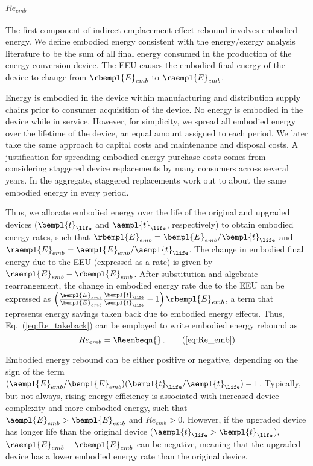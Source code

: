\paragraph{$Re_{emb}$}
\label{sec:Re_emb}

The first component of indirect emplacement effect rebound
involves embodied energy.
We define embodied energy consistent with the energy/exergy analysis literature
to be the sum of all final energy consumed
in the production of the energy conversion device.
The EEU
causes the embodied final energy of the device to change
from $\rbempl{E}_{emb}$ to $\raempl{E}_{emb}$.

Energy is embodied in the device within manufacturing and distribution supply chains
prior to consumer acquisition of the device.
No energy is embodied in the device while in service.
However, for simplicity, we spread all embodied energy
over the lifetime of the device,
an equal amount assigned to each period.
We later take the same approach to capital costs and
maintenance and disposal costs.
A justification for spreading embodied energy purchase costs comes from considering
staggered device replacements by many consumers across several years.
In the aggregate, staggered replacements
work out to about the same embodied energy in every period.

Thus, we allocate embodied energy over the life of the original and upgraded devices
($\bempl{t}_{\life}$ and $\aempl{t}_{\life}$, respectively)
to obtain embodied energy rates, such that
$\rbempl{E}_{emb} = \bempl{E}_{emb} / \bempl{t}_{\life}$
and 
$\raempl{E}_{emb} = \aempl{E}_{emb} / \aempl{t}_{\life}$.
The change in embodied final energy due to the EEU (expressed as a rate) is given by
$\raempl{E}_{emb} - \rbempl{E}_{emb}$.
After substitution and algebraic rearrangement,
the change in embodied energy rate due to the EEU can be expressed as
$\left( \frac{\aempl{E}_{emb}}{\bempl{E}_{emb}}
  \frac{\bempl{t}_{\life}}{\aempl{t}_{\life}} - 1 \right) \rbempl{E}_{emb}$, 
a term that represents energy savings taken back due to embodied energy effects.
Thus, Eq.~(\ref{eq:Re_takeback}) can be employed to write embodied energy rebound as
%
\begin{equation} 
  Re_{emb} = \Reembeqn{} \, . \tag{\ref{eq:Re_emb}}
\end{equation}

Embodied energy rebound can be either positive or negative, depending on 
the sign of the term
$(\aempl{E}_{emb}/\bempl{E}_{emb})(\bempl{t}_{\life}/\aempl{t}_{\life}) - 1$.
Typically, but not always,
rising energy efficiency is associated with increased device complexity
and more embodied energy,
such that $\aempl{E}_{emb} > \bempl{E}_{emb}$ and $Re_{emb} > 0$.
However, if the upgraded device has longer life than the original device
($\aempl{t}_{\life} > \bempl{t}_{\life}$),
$\raempl{E}_{emb} - \rbempl{E}_{emb}$ can be negative,
meaning that the upgraded device has a lower embodied energy rate than the original device.


